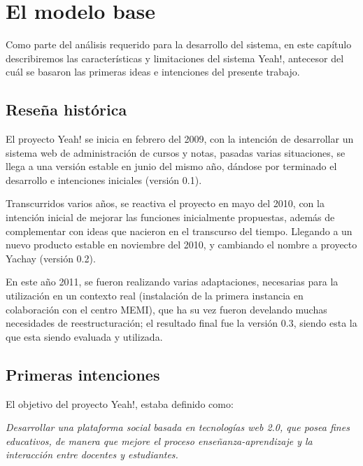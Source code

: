\chapter{El modelo base}

Como parte del análisis requerido para la desarrollo del sistema, en este capítulo describiremos las características y
limitaciones del sistema Yeah!, antecesor del cuál se basaron las primeras ideas e intenciones del presente trabajo.

\section{Reseña histórica}
El proyecto Yeah! se inicia en febrero del 2009, con la intención de desarrollar un sistema web de administración de
cursos y notas, pasadas varias situaciones, se llega a una versión estable en junio del mismo año, dándose por terminado
el desarrollo e intenciones iniciales (versión 0.1).

Transcurridos varios años, se reactiva el proyecto en mayo del 2010, con la intención inicial de mejorar las funciones
inicialmente propuestas, además de complementar con ideas que nacieron en el transcurso del tiempo. Llegando a un nuevo
producto estable en noviembre del 2010, y cambiando el nombre a proyecto Yachay  (versión 0.2).

En este año 2011, se fueron realizando varias adaptaciones, necesarias para la utilización en un contexto real
(instalación de la primera instancia en colaboración con el centro MEMI), que ha su vez fueron develando muchas
necesidades de reestructuración; el resultado final fue la versión 0.3, siendo esta la que esta siendo evaluada y
utilizada.

\section{Primeras intenciones}
El objetivo del proyecto Yeah!, estaba definido como:

\emph{Desarrollar una plataforma social basada en tecnologías web 2.0, que posea fines educativos, de manera que mejore
el proceso enseñanza-aprendizaje y la interacción entre docentes y estudiantes.}

